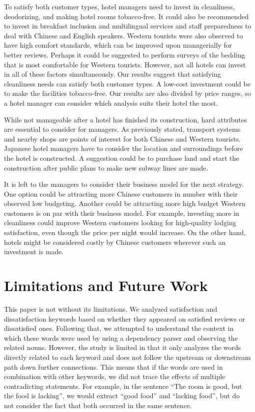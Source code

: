 \documentclass[smallextended,natbib]{svjour3}       %
\begin{document}
    To satisfy both customer types, hotel managers need to invest in cleanliness, deodorizing, and making hotel rooms tobacco-free. It could also be recommended to invest in breakfast inclusion and multilingual services and staff preparedness to deal with Chinese and English speakers. Western tourists were also observed to have high comfort standards, which can be improved upon managerially for better reviews. Perhaps it could be suggested to perform surveys of the bedding that is most comfortable for Western tourists. However, not all hotels can invest in all of these factors simultaneously. Our results suggest that satisfying cleanliness needs can satisfy both customer types. A low-cost investment could be to make the facilities tobacco-free. Our results are also divided by price ranges, so a hotel manager can consider which analysis suits their hotel the most.

    While not manageable after a hotel has finished its construction, hard attributes are essential to consider for managers. As previously stated, transport systems and nearby shops are points of interest for both Chinese and Western tourists. Japanese hotel managers have to consider the location and surroundings before the hotel is constructed. A suggestion could be to purchase land and start the construction after public plans to make new subway lines are made. 

    It is left to the managers to consider their business model for the next strategy. One option could be attracting more Chinese customers in number with their observed low budgeting. Another could be attracting more high budget Western customers is on par with their business model. For example, investing more in cleanliness could improve Western customers looking for high-quality lodging satisfaction, even though the price per night would increase. On the other hand, hotels might be considered costly by Chinese customers wherever such an investment is made.

\section{Limitations and Future Work}\label{limitations}

  This paper is not without its limitations. We analyzed satisfaction and dissatisfaction keywords based on whether they appeared on satisfied reviews or dissatisfied ones. Following that, we attempted to understand the context in which these words were used by using a dependency parser and observing the related nouns. However, the study is limited in that it only analyzes the words directly related to each keyword and does not follow the upstream or downstream path down further connections. This means that if the words are used in combination with other keywords, we did not trace the effects of multiple contradicting statements. For example, in the sentence ``The room is good, but the food is lacking'', we would extract ``good food'' and ``lacking food'', but do not consider the fact that both occurred in the same sentence.
\end{document}

